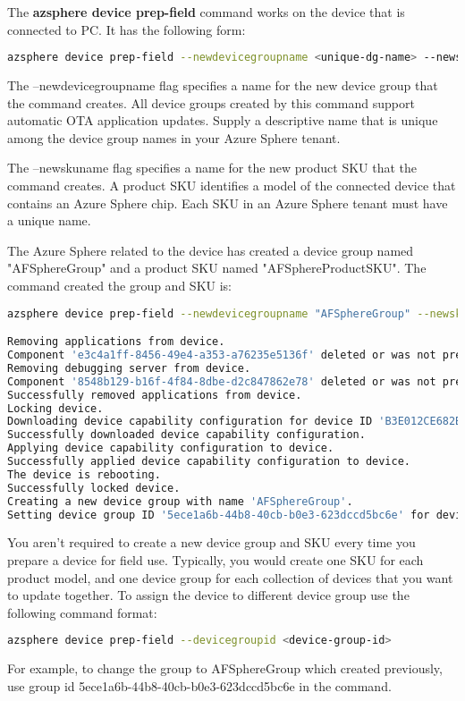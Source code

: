 The \textbf{azsphere device prep-field} command works on the device that is connected to PC. It has the following form:
\begin{lstlisting}[language=bash]
azsphere device prep-field --newdevicegroupname <unique-dg-name> --newskuname <unique-sku-name>
\end{lstlisting}

The --newdevicegroupname flag specifies a name for the new device group that the command creates. All device groups created by this command support automatic OTA application updates. Supply a descriptive name that is unique among the device group names in your Azure Sphere tenant.

The --newskuname flag specifies a name for the new product SKU that the command creates. A product SKU identifies a model of the connected device that contains an Azure Sphere chip. Each SKU in an Azure Sphere tenant must have a unique name.

The Azure Sphere related to the device has created a device group named "AFSphereGroup" and a product SKU named "AFSphereProductSKU". The command created the group and SKU is:
\begin{lstlisting}[language=bash]
azsphere device prep-field --newdevicegroupname "AFSphereGroup" --newskuname "AFSphereProductSKU"

Removing applications from device.
Component 'e3c4a1ff-8456-49e4-a353-a76235e5136f' deleted or was not present beforehand.
Removing debugging server from device.
Component '8548b129-b16f-4f84-8dbe-d2c847862e78' deleted or was not present beforehand.
Successfully removed applications from device.
Locking device.
Downloading device capability configuration for device ID 'B3E012CE682BA0A6235866AB3A87D838A4817E5C539832A34BF7A715CA8D015FF99C84B909CB2886916259AD186B212E148FC9C4BF8BB6A275A11A2B9495D578'.
Successfully downloaded device capability configuration.
Applying device capability configuration to device.
Successfully applied device capability configuration to device.
The device is rebooting.
Successfully locked device.
Creating a new device group with name 'AFSphereGroup'.
Setting device group ID '5ece1a6b-44b8-40cb-b0e3-623dccd5bc6e' for device with ID 'B3E012CE682BA0A6235866AB3A87D838A4817E5C539832A34BF7A715CA8D015FF99C84B909CB2886916259AD186B212E148FC9C4BF8BB6A275A11A2B9495D578'.
\end{lstlisting}

You aren't required to create a new device group and SKU every time you prepare a device for field use. Typically, you would create one SKU for each product model, and one device group for each collection of devices that you want to update together. To assign the device to different device group use the following command format:
\begin{lstlisting}[language=bash]
azsphere device prep-field --devicegroupid <device-group-id>
\end{lstlisting}
For example, to change the group to AFSphereGroup which created previously, use group id 5ece1a6b-44b8-40cb-b0e3-623dccd5bc6e in the command.

